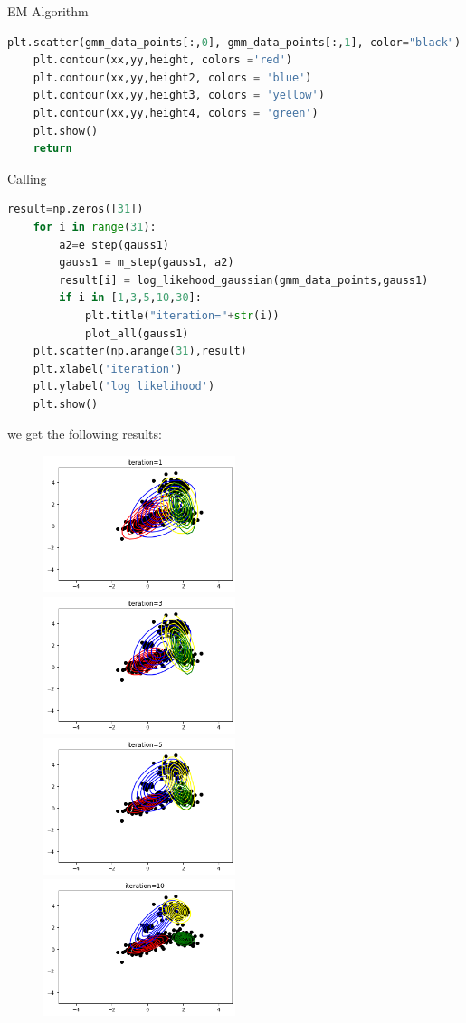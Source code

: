 \documentclass[
ngerman,
]{tudaexercise}
\begin{document}
\begin{task}{EM Algorithm}
\begin{subtask}
\begin{lstlisting}[language=Python]
	plt.scatter(gmm_data_points[:,0], gmm_data_points[:,1], color="black")
	plt.contour(xx,yy,height, colors ='red')
	plt.contour(xx,yy,height2, colors = 'blue')
	plt.contour(xx,yy,height3, colors = 'yellow')
	plt.contour(xx,yy,height4, colors = 'green')
	plt.show()
	return
\end{lstlisting}
Calling
\begin{lstlisting}[language=Python]
	result=np.zeros([31])
	for i in range(31):
		a2=e_step(gauss1)
		gauss1 = m_step(gauss1, a2)
		result[i] = log_likehood_gaussian(gmm_data_points,gauss1)
		if i in [1,3,5,10,30]:
			plt.title("iteration="+str(i))
			plot_all(gauss1)
	plt.scatter(np.arange(31),result)
	plt.xlabel('iteration')
	plt.ylabel('log likelihood')
	plt.show()
\end{lstlisting}
we get the following results:
\begin{figure}[H]
	\includegraphics[width=0.5\textwidth]{i1}
	\includegraphics[width=0.5\textwidth]{i2}
	\includegraphics[width=0.5\textwidth]{i3}
	\includegraphics[width=0.5\textwidth]{i4}

\end{figure}
\end{subtask}
\end{task}
\end{document}
